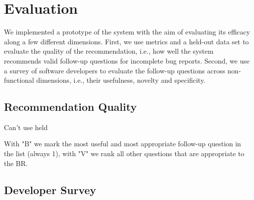 \section{Evaluation}

We implemented a prototype of the system with the aim of evaluating its efficacy along
a few different dimensions. First, we use metrics and a held-out data set to evaluate the quality
of the recommendation, i.e., how well the system recommends valid follow-up questions for incomplete bug reports.
Second, we use a survey of software developers to evaluate the follow-up questions across non-functional
dimensions, i.e., their usefulness, novelty and specificity.


\subsection{Recommendation Quality}

Can't use held


With "B" we mark the most useful and most appropriate follow-up question in the list (always 1), with "V" we rank all other questions that are appropriate to the BR.



\subsection{Developer Survey}
